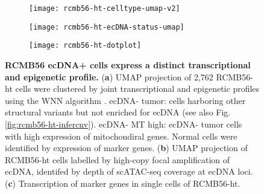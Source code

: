 \begin{figure}[!h]
    \centering
    \begin{subfigure}{.49\textwidth}
        \centering
        \texttt{[image: rcmb56-ht-celltype-umap-v2]}
        \caption{}
        \label{subfig:clustering-celltypes}
    \end{subfigure}
    \begin{subfigure}{.49\textwidth}
        \centering
        \texttt{[image: rcmb56-ht-ecDNA-status-umap]}
        \caption{}
        \label{subfig:clustering-ecDNA-status}
    \end{subfigure}
    \begin{subfigure}{.49\textwidth}
        \centering
        \texttt{[image: rcmb56-ht-dotplot]}
        \caption{}
        \label{subfig:clustering-exp-dotplot}
    \end{subfigure}
    \caption[RCMB56 ecDNA+ cells express a distinct transcriptional and epigenetic profile.]{\textbf{RCMB56 ecDNA+ cells express a distinct transcriptional and epigenetic profile.} (\textbf{a}) UMAP projection of 2,762 RCMB56-ht cells were clustered by joint transcriptional and epigenetic profiles using the WNN algorithm \cite{seurat_4}. ecDNA- tumor: cells harboring other structural variants but not enriched for ecDNA (see also Fig. \ref{fig:rcmb56-ht-infercnv}). ecDNA- MT high: ecDNA- tumor cells with high expression of mitochondiral genes. Normal cells were identified by expression of marker genes. (\textbf{b}) UMAP projection of RCMB56-ht cells labelled by high-copy focal amplification of ecDNA, identifed by depth of scATAC-seq coverage at ecDNA loci. (\textbf{c}) Transcription of marker genes in single cells of RCMB56-ht.  
    }
    \label{fig:rcmb56-ht-clustering}
\end{figure}

